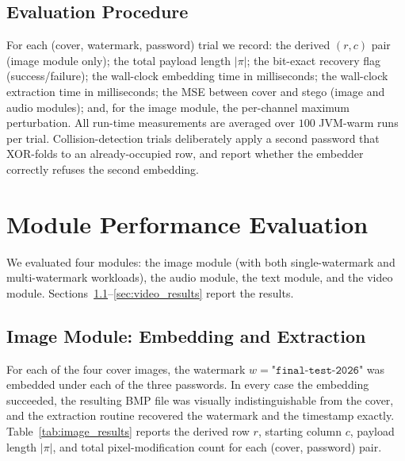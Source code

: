 \subsection{Evaluation Procedure}

For each (cover, watermark, password) trial we record: the derived $(r, c)$ pair (image module only); the total payload length $|\pi|$; the bit-exact recovery flag (success/failure); the wall-clock embedding time in milliseconds; the wall-clock extraction time in milliseconds; the MSE between cover and stego (image and audio modules); and, for the image module, the per-channel maximum perturbation. All run-time measurements are averaged over $100$ JVM-warm runs per trial. Collision-detection trials deliberately apply a second password that XOR-folds to an already-occupied row, and report whether the embedder correctly refuses the second embedding.

\section{Module Performance Evaluation}
\label{sec:experiments}

We evaluated four modules: the image module (with both single-watermark and multi-watermark workloads), the audio module, the text module, and the video module. Sections~\ref{sec:image_results}--\ref{sec:video_results} report the results.

\subsection{Image Module: Embedding and Extraction}
\label{sec:image_results}

For each of the four cover images, the watermark $w = \texttt{"final-test-2026"}$ was embedded under each of the three passwords. In every case the embedding succeeded, the resulting BMP file was visually indistinguishable from the cover, and the extraction routine recovered the watermark and the timestamp exactly. Table~\ref{tab:image_results} reports the derived row $r$, starting column $c$, payload length $|\pi|$, and total pixel-modification count for each (cover, password) pair.

